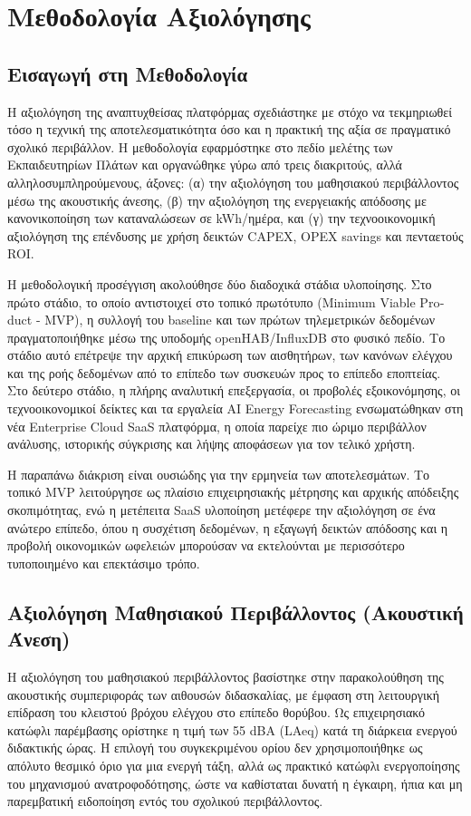 ﻿\chapter{Μεθοδολογία Αξιολόγησης}

\section{Εισαγωγή στη Μεθοδολογία}
Η αξιολόγηση της αναπτυχθείσας πλατφόρμας σχεδιάστηκε με στόχο να τεκμηριωθεί τόσο η τεχνική της αποτελεσματικότητα όσο και η πρακτική της αξία σε πραγματικό σχολικό περιβάλλον. Η μεθοδολογία εφαρμόστηκε στο πεδίο μελέτης των Εκπαιδευτηρίων Πλάτων και οργανώθηκε γύρω από τρεις διακριτούς, αλλά αλληλοσυμπληρούμενους, άξονες: (α) την αξιολόγηση του μαθησιακού περιβάλλοντος μέσω της ακουστικής άνεσης, (β) την αξιολόγηση της ενεργειακής απόδοσης με κανονικοποίηση των καταναλώσεων σε \textlatin{kWh}/ημέρα, και (γ) την τεχνοοικονομική αξιολόγηση της επένδυσης με χρήση δεικτών \textlatin{CAPEX}, \textlatin{OPEX savings} και πενταετούς \textlatin{ROI}.

Η μεθοδολογική προσέγγιση ακολούθησε δύο διαδοχικά στάδια υλοποίησης. Στο πρώτο στάδιο, το οποίο αντιστοιχεί στο τοπικό πρωτότυπο (\textlatin{Minimum Viable Product - MVP}), η συλλογή του \textlatin{baseline} και των πρώτων τηλεμετρικών δεδομένων πραγματοποιήθηκε μέσω της υποδομής \textlatin{openHAB}/\textlatin{InfluxDB} στο φυσικό πεδίο. Το στάδιο αυτό επέτρεψε την αρχική επικύρωση των αισθητήρων, των κανόνων ελέγχου και της ροής δεδομένων από το επίπεδο των συσκευών προς το επίπεδο εποπτείας. Στο δεύτερο στάδιο, η πλήρης αναλυτική επεξεργασία, οι προβολές εξοικονόμησης, οι τεχνοοικονομικοί δείκτες και τα εργαλεία \textlatin{AI Energy Forecasting} ενσωματώθηκαν στη νέα \textlatin{Enterprise Cloud SaaS} πλατφόρμα, η οποία παρείχε πιο ώριμο περιβάλλον ανάλυσης, ιστορικής σύγκρισης και λήψης αποφάσεων για τον τελικό χρήστη.

Η παραπάνω διάκριση είναι ουσιώδης για την ερμηνεία των αποτελεσμάτων. Το τοπικό \textlatin{MVP} λειτούργησε ως πλαίσιο επιχειρησιακής μέτρησης και αρχικής απόδειξης σκοπιμότητας, ενώ η μετέπειτα \textlatin{SaaS} υλοποίηση μετέφερε την αξιολόγηση σε ένα ανώτερο επίπεδο, όπου η συσχέτιση δεδομένων, η εξαγωγή δεικτών απόδοσης και η προβολή οικονομικών ωφελειών μπορούσαν να εκτελούνται με περισσότερο τυποποιημένο και επεκτάσιμο τρόπο.

\section{Αξιολόγηση Μαθησιακού Περιβάλλοντος (Ακουστική Άνεση)}
Η αξιολόγηση του μαθησιακού περιβάλλοντος βασίστηκε στην παρακολούθηση της ακουστικής συμπεριφοράς των αιθουσών διδασκαλίας, με έμφαση στη λειτουργική επίδραση του κλειστού βρόχου ελέγχου στο επίπεδο θορύβου. Ως επιχειρησιακό κατώφλι παρέμβασης ορίστηκε η τιμή των 55 \textlatin{dBA} (\textlatin{LAeq}) κατά τη διάρκεια ενεργού διδακτικής ώρας. Η επιλογή του συγκεκριμένου ορίου δεν χρησιμοποιήθηκε ως απόλυτο θεσμικό όριο για μια ενεργή τάξη, αλλά ως πρακτικό κατώφλι ενεργοποίησης του μηχανισμού ανατροφοδότησης, ώστε να καθίσταται δυνατή η έγκαιρη, ήπια και μη παρεμβατική ειδοποίηση εντός του σχολικού περιβάλλοντος.

